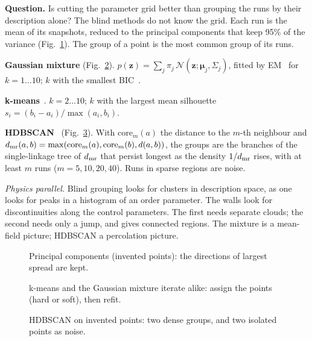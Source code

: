 \documentclass[11pt,a4paper]{article}
\begin{document}
\begin{tech}
\textbf{Question.} Is cutting the parameter grid better than grouping the runs by their description alone? The
blind methods do not know the grid. Each run is the mean of its snapshots, reduced to the principal components that
keep 95\% of the variance (Fig.~\ref{fig:pca}). The group of a point is the most common group of its runs.

\textbf{Gaussian mixture} (Fig.~\ref{fig:emlloyd}). $p(\mathbf z)=\sum_j\pi_j\,\mathcal N(\mathbf z;\boldsymbol\mu_j,\Sigma_j)$,
fitted by EM~\cite{dempster1977} for $k=1\ldots10$; $k$ with the smallest BIC~\cite{schwarz1978}.

\textbf{k-means}~\cite{lloyd1982}. $k=2\ldots10$; $k$ with the largest mean silhouette~\cite{rousseeuw1987}
$s_i=(b_i-a_i)/\max(a_i,b_i)$.

\textbf{HDBSCAN}~\cite{campello2013} (Fig.~\ref{fig:hdbscan}). With $\mathrm{core}_m(a)$ the distance to the $m$-th
neighbour and $d_{\rm mr}(a,b)=\max(\mathrm{core}_m(a),\mathrm{core}_m(b),d(a,b))$, the groups are the branches of
the single-linkage tree of $d_{\rm mr}$ that persist longest as the density $1/d_{\rm mr}$ rises, with at least $m$
runs ($m=5,10,20,40$). Runs in sparse regions are noise.

\emph{Physics parallel.} Blind grouping looks for clusters in description space, as one looks for peaks in a
histogram of an order parameter. The walls look for discontinuities along the control parameters. The first needs
separate clouds; the second needs only a jump, and gives connected regions. The mixture is a mean-field picture;
HDBSCAN a percolation picture.
\end{tech}

\begin{figure}[H]
\centering

\caption{Principal components (invented points): the directions of largest spread are kept.}\label{fig:pca}
\end{figure}

\begin{figure}[H]
\centering

\caption{k-means and the Gaussian mixture iterate alike: assign the points (hard or soft), then refit.}\label{fig:emlloyd}
\end{figure}

\begin{figure}[H]
\centering

\caption{HDBSCAN on invented points: two dense groups, and two isolated points as noise.}\label{fig:hdbscan}
\end{figure}
\end{document}
